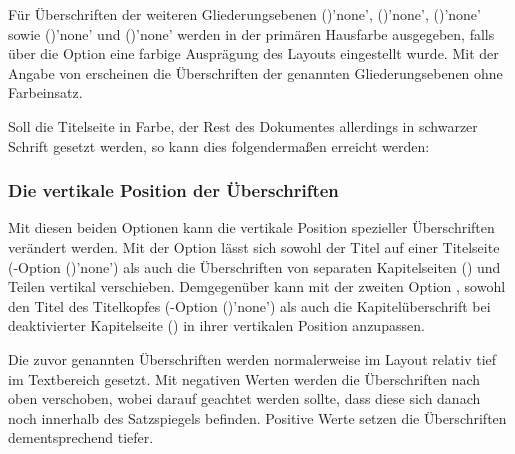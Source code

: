 \begin{Declaration*}{}
\begin{Declaration*}{}
\begin{Declaration*}{}
\begin{Declaration}[v2.05]{}
\printdeclarationlist%
%
Für Überschriften der weiteren Gliederungsebenen
()'none', 
()'none', 
()'none' sowie 
()'none' und 
()'none'
werden in der primären Hausfarbe  ausgegeben, falls über die 
Option  eine farbige Ausprägung des Layouts eingestellt wurde. 
Mit der Angabe von  erscheinen die Überschriften der 
genannten Gliederungsebenen ohne Farbeinsatz.
\end{Declaration}
%
\begin{Example}
Soll die Titelseite in Farbe, der Rest des Dokumentes allerdings in schwarzer 
Schrift gesetzt werden, so kann dies folgendermaßen erreicht werden:
%
%
\end{Example}


\subsubsection{Die vertikale Position der Überschriften}
\begin{Declaration}[v2.05]{}
\begin{Declaration}[v2.05]{}
\printdeclarationlist%
%
%
%
Mit diesen beiden Optionen kann die vertikale Position spezieller Überschriften 
verändert werden. Mit der Option  lässt sich sowohl 
der Titel auf einer Titelseite 
(\KOMAScript-Option ()'none') als 
auch die Überschriften von separaten Kapitelseiten () 
und Teilen vertikal verschieben. Demgegenüber kann mit der zweiten Option 
, sowohl den Titel des Titelkopfes 
(\KOMAScript-Option ()'none') als 
auch die Kapitelüberschrift bei deaktivierter Kapitelseite 
() in ihrer vertikalen Position anzupassen.

Die zuvor genannten Überschriften werden normalerweise im Layout relativ tief 
im Textbereich gesetzt. Mit negativen Werten werden die Überschriften nach oben 
verschoben, wobei darauf geachtet werden sollte, dass diese sich danach noch 
innerhalb des Satzspiegels befinden. Positive Werte setzen die Überschriften 
dementsprechend tiefer.
%
\end{Declaration}
\end{Declaration}




\end{Declaration*}
\end{Declaration*}
\end{Declaration*}
